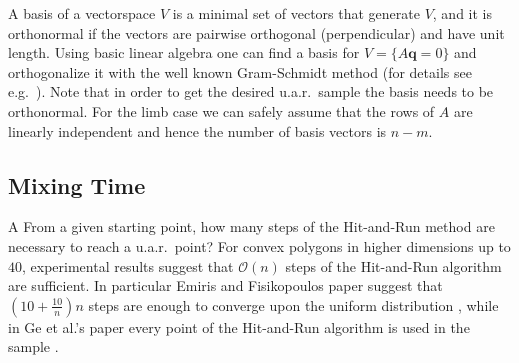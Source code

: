 A basis of a vectorspace $V$ is a minimal set of vectors that generate $V$, and it is orthonormal if the vectors are pairwise orthogonal (perpendicular) and have unit length. Using basic linear algebra one can find a basis for $V = \{A\textbf{q} = 0\}$ and orthogonalize it with the well known Gram-Schmidt method (for details see e.g.\ \cite{Robertson}). Note that in order to get the desired u.a.r.\ sample the basis needs to be orthonormal. For the limb case we can safely assume that the rows of $A$ are linearly independent and hence the number of basis vectors is $n-m$.



\subsection{Mixing Time}
\label{sec_lengthrun}
A%
From a given starting point, how many steps of the Hit-and-Run method are necessary to reach a u.a.r.\ point? For convex polygons in higher dimensions up to $40$, experimental results suggest that $\mathcal{O}(n)$ steps of the Hit-and-Run algorithm are sufficient.
In particular Emiris and Fisikopoulos paper suggest that $(10 + \frac{10}{n})n$ steps are enough to converge upon the uniform distribution \cite{emiris2013efficient}, while in Ge et al.'s paper every point of the Hit-and-Run algorithm is used in the sample \cite{Ge}. 


